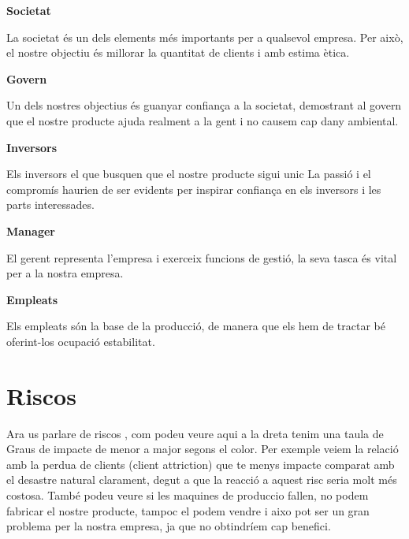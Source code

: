 \documentclass[12pt, a4papre]{article}
\begin{document}
\textbf{Societat}

La societat és un dels elements més importants per a qualsevol empresa.
Per això, el nostre objectiu és millorar la quantitat de clients i amb estima ètica. 


\textbf{Govern}


Un dels nostres objectius és guanyar confiança a la societat,  demostrant al govern que el nostre producte
ajuda realment a la gent i no causem cap dany ambiental.









\textbf{Inversors}
	
Els inversors el que busquen que el nostre producte sigui unic La passió i el compromís haurien de ser evidents per inspirar confiança en els inversors i les parts interessades.

\textbf{Manager}

El gerent representa l’empresa i exerceix funcions de gestió, la seva tasca és vital per a la nostra empresa.


\textbf{Empleats}


Els empleats són la base de la producció, de manera que els hem de tractar bé oferint-los ocupació
estabilitat.




\section{Riscos}
Ara us parlare de riscos , com podeu veure aqui a la dreta tenim una taula de Graus de impacte de menor a major segons el color. Per exemple veiem la relació amb la perdua de clients (client attriction) que te menys impacte comparat amb el desastre natural clarament, degut a que la reacció a aquest risc seria molt més costosa. També podeu veure si les maquines de produccio fallen, no podem fabricar el nostre producte, tampoc el podem vendre i aixo pot ser un gran problema per la nostra empresa, ja que no obtindríem cap benefici.\\\\
\end{document}
